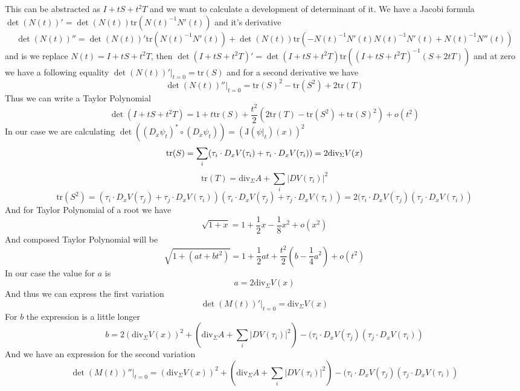 This can be abstracted as $I+tS+t^2T$ and we want to calculate a development
of determinant of it. We have a Jacobi formula $\det(N(t))'=\det(N(t))\text{tr}
(N(t)^{-1}N'(t))$ and it's derivative
\[\det(N(t))''=\det(N(t))'\text{tr}(N(t)^{-1}N'(t))+\det(N(t))\text{tr}(-N(t)^
{-1}N'(t)N(t)^{-1}N'(t)+N(t)^{-1}N''(t))\]
and is we replace $N(t)=I+tS+t^2T$, then $\det(I+tS+t^2T)'=\det(I+tS+t^2T)\text{tr}
((I+tS+t^2T)^{-1}(S+2tT))$ and at zero we have a following equality
$\det(N(t))'|_{t=0}=\text{tr}(S)$ and for a second derivative we have
\[\det(N(t))''|_{t=0}=\text{tr}(S)^2-\text{tr}(S^2)+2\text{tr}(T)\]
Thus we can write a Taylor Polynomial
\[\det(I+tS+t^2T)=1+t\text{tr}(S)+\frac{t^2}{2}(2\text{tr}(T)-\text{tr}(S^2)+\text{tr}(S)^2)+o(t^2)\]
In our case we are calculating $\det((D_x\psi_t)^*\circ(D_x\psi_t))=(\text{J}(\psi|_t)(x))^2$
\[
    \text{tr}(S)=\sum_i(\tau_i\cdot D_xV(\tau_i)+\tau_i\cdot D_xV(\tau_i))=2\text{div}_\Sigma V(x)\\
\]
\[
    \text{tr}(T)=\text{div}_\Sigma A+\sum_i|DV(\tau_i)|^2
\]
\[
    \text{tr}(S^2)=(\tau_i\cdot D_xV(\tau_j)+\tau_j\cdot D_xV(\tau_i))(\tau_i\cdot D_xV(\tau_j)+\tau_j\cdot D_xV(\tau_i))
    =2(\tau_i\cdot D_xV(\tau_j)(\tau_j\cdot D_xV(\tau_i))
\]
And for Taylor Polynomial of a root we have
\[\sqrt{1+x}=1+\frac{1}{2}x-\frac{1}{8}x^2+o(x^2)\]
And composed Taylor Polynomial will be
\[\sqrt{1+(at+bt^2)}=1+\frac{1}{2}at+\frac{t^2}{2}(b-\frac{1}{4}a^2)+o(t^2)\]
In our case the value for $a$ is
\[a=2\text{div}_\Sigma V(x)\]
And thus we can express the first variation
\[\det(M(t))'|_{t=0}=\text{div}_\Sigma V(x)\]
For $b$ the expression is a little longer
\[b=2(\text{div}_\Sigma V(x))^2+(\text{div}_\Sigma A+\sum_i|DV(\tau_i)|^2)-(\tau_i\cdot D_xV(\tau_j)(\tau_j\cdot D_xV(\tau_i))\]
And we have an expression for the second variation
\[\det(M(t))''|_{t=0}=(\text{div}_\Sigma V(x))^2+(\text{div}_\Sigma A+\sum_i|DV(\tau_i)|^2)-(\tau_i\cdot D_xV(\tau_j)(\tau_j\cdot D_xV(\tau_i))\]
